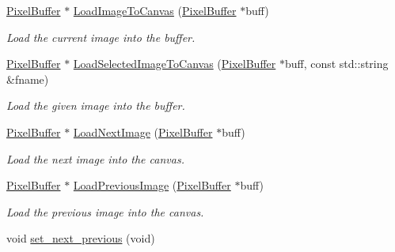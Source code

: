 \begin{DoxyCompactItemize}
\item 
\hyperlink{classimage__tools_1_1PixelBuffer}{Pixel\+Buffer} $\ast$ \hyperlink{classimage__tools_1_1MIAIOManager_aff41de4c44ff8416fa55c01c5e8042d5}{Load\+Image\+To\+Canvas} (\hyperlink{classimage__tools_1_1PixelBuffer}{Pixel\+Buffer} $\ast$buff)
\begin{DoxyCompactList}\small\item\em Load the current image into the buffer. \end{DoxyCompactList}\item 
\hyperlink{classimage__tools_1_1PixelBuffer}{Pixel\+Buffer} $\ast$ \hyperlink{classimage__tools_1_1MIAIOManager_a9a3dc0e1ceea23aef0013a60299bd778}{Load\+Selected\+Image\+To\+Canvas} (\hyperlink{classimage__tools_1_1PixelBuffer}{Pixel\+Buffer} $\ast$buff, const std\+::string \&fname)
\begin{DoxyCompactList}\small\item\em Load the given image into the buffer. \end{DoxyCompactList}\item 
\hyperlink{classimage__tools_1_1PixelBuffer}{Pixel\+Buffer} $\ast$ \hyperlink{classimage__tools_1_1MIAIOManager_ad945d8a5be8a8052fbef9f700a9a6288}{Load\+Next\+Image} (\hyperlink{classimage__tools_1_1PixelBuffer}{Pixel\+Buffer} $\ast$buff)
\begin{DoxyCompactList}\small\item\em Load the next image into the canvas. \end{DoxyCompactList}\item 
\hyperlink{classimage__tools_1_1PixelBuffer}{Pixel\+Buffer} $\ast$ \hyperlink{classimage__tools_1_1MIAIOManager_a59a7fe6d6fe2ea9c42709a91ab172e93}{Load\+Previous\+Image} (\hyperlink{classimage__tools_1_1PixelBuffer}{Pixel\+Buffer} $\ast$buff)
\begin{DoxyCompactList}\small\item\em Load the previous image into the canvas. \end{DoxyCompactList}\item 
void \hyperlink{classimage__tools_1_1MIAIOManager_aaabbc33103a9d4753423ecba75984842}{set\+\_\+next\+\_\+previous} (void)\hypertarget{classimage__tools_1_1MIAIOManager_aaabbc33103a9d4753423ecba75984842}{}\label{classimage__tools_1_1MIAIOManager_aaabbc33103a9d4753423ecba75984842}


\end{DoxyCompactItemize}
